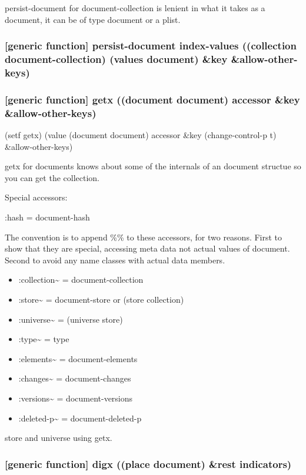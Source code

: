 \documentclass[11pt]{article}
\begin{document}
persist-document for document-collection is lenient in what it takes
as a document, it can be of type document or a plist.

\subsubsection{[generic function] persist-document index-values ((collection document-collection) (values document) \&key \&allow-other-keys)}
\label{sec:org145fede}

\subsubsection{[generic function] getx ((document document) accessor \&key \&allow-other-keys)}
\label{sec:orgab4fc6e}

(setf getx) (value (document document) accessor  \&key (change-control-p t) \&allow-other-keys)

getx for documents knows about some of the internals of an document
structue so you can get the collection.

Special accessors:

:hash = document-hash

The convention is to append \%\% to these accessors, for two
reasons. First to show that they are special, accessing meta data not
actual values of document. Second to avoid any name classes with
actual data members.

\begin{itemize}
\item :collection\textasciitilde{} = document-collection
\item :store\textasciitilde{} = document-store or (store collection)
\item :universe\textasciitilde{} = (universe store)
\item :type\textasciitilde{} = type
\item :elements\textasciitilde{} = document-elements
\item :changes\textasciitilde{} = document-changes
\item :versions\textasciitilde{} = document-versions
\item :deleted-p\textasciitilde{} = document-deleted-p
\end{itemize}

store and universe using getx.

\subsubsection{[generic function] digx ((place document) \&rest indicators)}
\label{sec:org3a15675}
\end{document}
